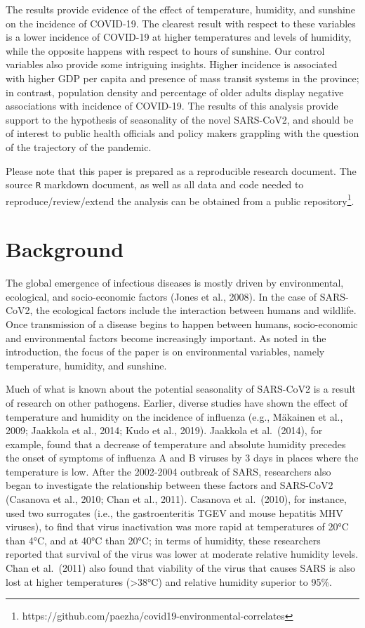 \documentclass[]{elsarticle} %
\begin{document}
The results provide evidence of the effect of temperature, humidity, and
sunshine on the incidence of COVID-19. The clearest result with respect
to these variables is a lower incidence of COVID-19 at higher
temperatures and levels of humidity, while the opposite happens with
respect to hours of sunshine. Our control variables also provide some
intriguing insights. Higher incidence is associated with higher GDP per
capita and presence of mass transit systems in the province; in
contrast, population density and percentage of older adults display
negative associations with incidence of COVID-19. The results of this
analysis provide support to the hypothesis of seasonality of the novel
SARS-CoV2, and should be of interest to public health officials and
policy makers grappling with the question of the trajectory of the
pandemic.

Please note that this paper is prepared as a reproducible research
document. The source \texttt{R} markdown document, as well as all data
and code needed to reproduce/review/extend the analysis can be obtained
from a public
repository\footnote{https://github.com/paezha/covid19-environmental-correlates}.

\hypertarget{background}{%
\section{Background}\label{background}}

The global emergence of infectious diseases is mostly driven by
environmental, ecological, and socio-economic factors (Jones et al.,
2008). In the case of SARS-CoV2, the ecological factors include the
interaction between humans and wildlife. Once transmission of a disease
begins to happen between humans, socio-economic and environmental
factors become increasingly important. As noted in the introduction, the
focus of the paper is on environmental variables, namely temperature,
humidity, and sunshine.

Much of what is known about the potential seasonality of SARS-CoV2 is a
result of research on other pathogens. Earlier, diverse studies have
shown the effect of temperature and humidity on the incidence of
influenza (e.g., Mäkainen et al., 2009; Jaakkola et al., 2014; Kudo et
al., 2019). Jaakkola et al.~(2014), for example, found that a decrease
of temperature and absolute humidity precedes the onset of symptoms of
influenza A and B viruses by 3 days in places where the temperature is
low. After the 2002-2004 outbreak of SARS, researchers also began to
investigate the relationship between these factors and SARS-CoV2
(Casanova et al., 2010; Chan et al., 2011). Casanova et al.~(2010), for
instance, used two surrogates (i.e., the gastroenteritis TGEV and mouse
hepatitis MHV viruses), to find that virus inactivation was more rapid
at temperatures of 20°C than 4°C, and at 40°C than 20°C; in terms of
humidity, these researchers reported that survival of the virus was
lower at moderate relative humidity levels. Chan et al.~(2011) also
found that viability of the virus that causes SARS is also lost at
higher temperatures (\textgreater38°C) and relative humidity superior to
95\%.
\end{document}
